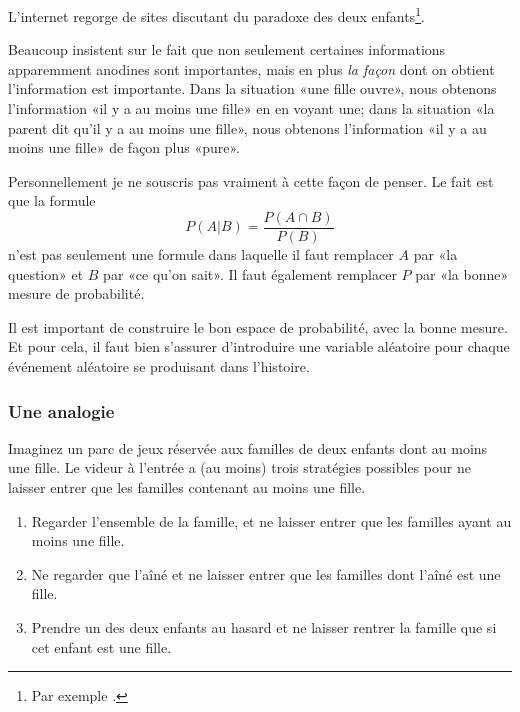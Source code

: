 L'internet regorge de sites discutant du paradoxe des deux enfants\footnote{Par exemple \cite{BIBooBXKDooOTEkjy}.}.

Beaucoup insistent sur le fait que non seulement certaines informations apparemment anodines sont importantes, mais en plus \emph{la façon} dont on obtient l'information est importante. Dans la situation «une fille ouvre», nous obtenons l'information «il y a au moins une fille» en en voyant une; dans la situation «la parent dit qu'il y a au moins une fille», nous obtenons l'information «il y a au moins une fille» de façon plus «pure».

Personnellement je ne souscris pas vraiment à cette façon de penser. Le fait est que la formule
\begin{equation}
	P(A|B)=\frac{ P(A\cap B) }{ P(B) }
\end{equation}
n'est pas seulement une formule dans laquelle il faut remplacer \( A\) par «la question» et \( B\) par «ce qu'on sait». Il faut également remplacer \( P\) par «la bonne» mesure de probabilité.

Il est important de construire le bon espace de probabilité, avec la bonne mesure. Et pour cela, il faut bien s'assurer d'introduire une variable aléatoire pour chaque événement aléatoire se produisant dans l'histoire.

\subsubsection{Une analogie}

Imaginez un parc de jeux réservée aux familles de deux enfants dont au moins une fille. Le videur à l'entrée a (au moins) trois stratégies possibles pour ne laisser entrer que les familles contenant au moins une fille.

\begin{enumerate}
	\item
	      Regarder l'ensemble de la famille, et ne laisser entrer que les familles ayant au moins une fille.
	\item
	      Ne regarder que l'aîné et ne laisser entrer que les familles dont l'aîné est une fille.
	\item\label{ITEMooRKUAooGtfavc}
	      Prendre un des deux enfants au hasard et ne laisser rentrer la famille que si cet enfant est une fille.
\end{enumerate}

